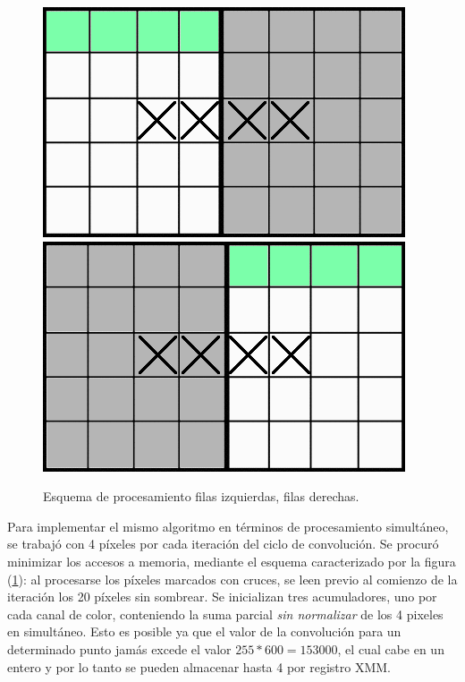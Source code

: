 \begin{figure}[h]
\begin{center}
  \includegraphics[scale=0.4]{secciones/filtro_miniature/imagenes/grid.png}
  \includegraphics[scale=0.4]{secciones/filtro_miniature/imagenes/grid-inv.png}
\end{center}
\caption{Esquema de procesamiento filas izquierdas, filas derechas.}
\label{fig:filtro-miniature-grillas}
\end{figure}

Para implementar el mismo algoritmo en términos de procesamiento simultáneo, se trabajó con 4 píxeles por cada iteración del ciclo de convolución. Se procuró minimizar los accesos a memoria, mediante el esquema caracterizado por la figura (\ref{fig:filtro-miniature-grillas}): al procesarse los píxeles marcados con cruces, se leen previo al comienzo de la iteración los 20 píxeles sin sombrear. Se inicializan tres acumuladores, uno por cada canal de color, conteniendo la suma parcial \emph{sin normalizar} de los 4 pixeles en simultáneo. Esto es posible ya que el valor de la convolución para un determinado punto jamás excede el valor $255 * 600 = 153000$, el cual cabe en un entero  y por lo tanto se pueden almacenar hasta 4 por registro XMM.


